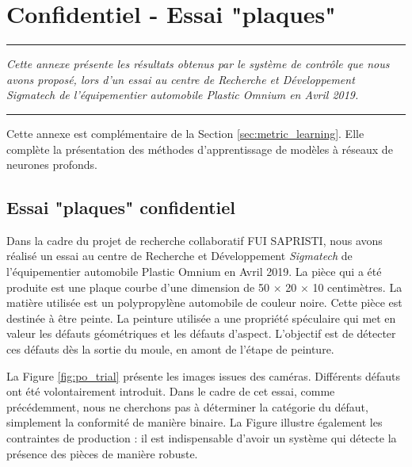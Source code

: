 \FloatBarrier
\chapter{Confidentiel - Essai "plaques"}
\label{Ann:plaques}

\begin{center}
	\rule{0.7\linewidth}{.5pt}
	\begin{minipage}{0.7\linewidth}
		\smallskip
		\textit{
			Cette annexe présente les résultats obtenus par le système de contrôle que nous avons proposé, lors d'un essai au centre de Recherche et Développement \textit{Sigmatech} de l'équipementier automobile Plastic Omnium en Avril 2019.
		}
	\end{minipage}
	\smallskip
	\rule{0.7\linewidth}{.5pt}
\end{center}

\bigskip

Cette annexe est complémentaire de la Section \ref{sec:metric_learning}.
Elle complète la présentation des méthodes d'apprentissage de modèles à réseaux de neurones profonds.

\section{Essai "plaques" confidentiel} \label{sec:plaques}
Dans la cadre du projet de recherche collaboratif FUI SAPRISTI, nous avons réalisé un essai au centre de Recherche et Développement \textit{Sigmatech} de l'équipementier automobile Plastic Omnium en Avril 2019.
La pièce qui a été produite est une plaque courbe d'une dimension de 50 $\times$ 20 $\times$ 10 centimètres.
La matière utilisée est un polypropylène automobile de couleur noire.
Cette pièce est destinée à être peinte.
La peinture utilisée a une propriété spéculaire qui met en valeur les défauts géométriques et les défauts d'aspect.
L'objectif est de détecter ces défauts dès la sortie du moule, en amont de l'étape de peinture.

La Figure \ref{fig:po_trial} présente les images issues des caméras.
Différents défauts ont été volontairement introduit.
Dans le cadre de cet essai, comme précédemment, nous ne cherchons pas à déterminer la catégorie du défaut, simplement la conformité de manière binaire.
La Figure illustre également les contraintes de production : il est indispensable d'avoir un système qui détecte la présence des pièces de manière robuste.

